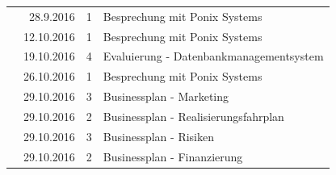 \documentclass[12pt]{article}
\begin{document}
\begin{table}[hp]
\begin{tabular}{|l|r|c|l|}
                                                                                                      & 28.9.2016                           & 1                                         & Besprechung mit Ponix Systems                                                                        \\ \cline{2-4} 
                                                                                                      & 12.10.2016                          & 1                                         & Besprechung mit Ponix Systems                                                                        \\ \cline{2-4} 
                                                                                                      & 19.10.2016                          & 4                                         & Evaluierung - Datenbankmanagementsystem                                                              \\ \cline{2-4} 
                                                                                                      & 26.10.2016                          & 1                                         & Besprechung mit Ponix Systems                                                                        \\ \cline{2-4} 
                                                                                                      & 29.10.2016                          & 3                                         & Businessplan - Marketing                                                                             \\ \cline{2-4} 
                                                                                                      & 29.10.2016                          & 2                                         & Businessplan - Realisierungsfahrplan                                                                 \\ \cline{2-4} 
                                                                                                      & 29.10.2016                          & 3                                         & Businessplan - Risiken                                                                               \\ \cline{2-4} 
                                                                                                      & 29.10.2016                          & 2                                         & Businessplan - Finanzierung                                                                          \\ \cline{2-4} 

\end{tabular}
\end{table}
\end{document}
